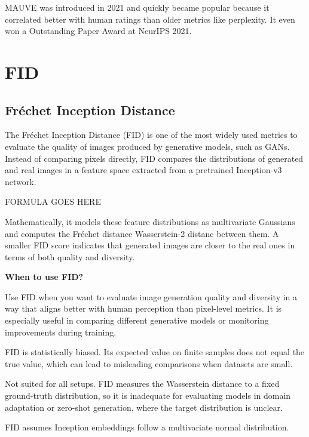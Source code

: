 \clearpage

\thispagestyle{customstyle}

{MAUVE was introduced in 2021 and quickly became popular because it correlated better with human ratings than older metrics like perplexity.
It even won a Outstanding Paper Award at NeurIPS 2021.}

\clearpage
\thispagestyle{genaistyle}
\section{FID}
\subsection{Fréchet Inception Distance}


The Fréchet Inception Distance (FID) is one of the most widely used metrics to evaluate the quality of images produced by generative models,
such as GANs. Instead of comparing pixels directly, FID compares the distributions of generated and real images in a feature space extracted
from a pretrained Inception-v3 network.

\begin{center}
    FORMULA GOES HERE
\end{center}

Mathematically, it models these feature distributions as multivariate Gaussians and computes the Fréchet distance Wasserstein-2 distanc between them.
A smaller FID score indicates that generated images are closer to the real ones in terms of both quality and diversity.

\textbf{When to use FID?}

Use FID when you want to evaluate image generation quality and diversity in a way that aligns better with human perception than pixel-level metrics.
It is especially useful in comparing different generative models or monitoring improvements during training.

{
\item FID is statistically biased. Its expected value on finite samples does not equal the true value, which can lead to misleading
comparisons when datasets are small.
\item Not suited for all setups. FID measures the Wasserstein distance to a fixed ground-truth distribution, so it is inadequate for
evaluating models in domain adaptation or zero-shot generation, where the target distribution is unclear.
\item FID assumes Inception embeddings follow a multivariate normal distribution.
}

